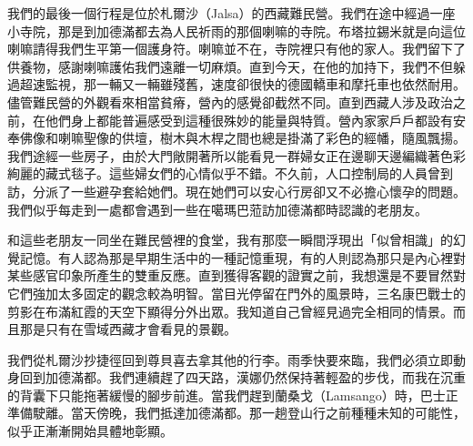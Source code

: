 我們的最後一個行程是位於札爾沙（Jalsa）的西藏難民營。我們在途中經過一座小寺院，那是到加德滿都去為人民祈雨的那個喇嘛的寺院。布塔拉錫米就是向這位喇嘛請得我們生平第一個護身符。喇嘛並不在，寺院裡只有他的家人。我們留下了供養物，感謝喇嘛護佑我們遠離一切麻煩。直到今天，在他的加持下，我們不但躲過超速監視，那一輛又一輛雖殘舊，速度卻很快的德國轎車和摩托車也依然耐用。儘管難民營的外觀看來相當貧瘠，營內的感覺卻截然不同。直到西藏人涉及政治之前，在他們身上都能普遍感受到這種很殊妙的能量與特質。營內家家戶戶都設有安奉佛像和喇嘛聖像的供壇，樹木與木桿之間也總是掛滿了彩色的經幡，隨風飄揚。我們途經一些房子，由於大門敞開著所以能看見一群婦女正在邊聊天邊編織著色彩絢麗的藏式毯子。這些婦女們的心情似乎不錯。不久前，人口控制局的人員曾到訪，分派了一些避孕套給她們。現在她們可以安心行房卻又不必擔心懷孕的問題。我們似乎每走到一處都會遇到一些在噶瑪巴蒞訪加德滿都時認識的老朋友。

和這些老朋友一同坐在難民營裡的食堂，我有那麼一瞬間浮現出「似曾相識」的幻覺記憶。有人認為那是早期生活中的一種記憶重現，有的人則認為那只是內心裡對某些感官印象所產生的雙重反應。直到獲得客觀的證實之前，我想還是不要冒然對它們強加太多固定的觀念較為明智。當目光停留在門外的風景時，三名康巴戰士的剪影在布滿紅霞的天空下顯得分外出眾。我知道自己曾經見過完全相同的情景。而且那是只有在雪域西藏才會看見的景觀。

我們從札爾沙抄捷徑回到尊貝喜去拿其他的行李。雨季快要來臨，我們必須立即動身回到加德滿都。我們連續趕了四天路，漢娜仍然保持著輕盈的步伐，而我在沉重的背囊下只能拖著緩慢的腳步前進。當我們趕到蘭桑戈（Lamsango）時，巴士正準備駛離。當天傍晚，我們抵達加德滿都。那一趟登山行之前種種未知的可能性，似乎正漸漸開始具體地彰顯。

